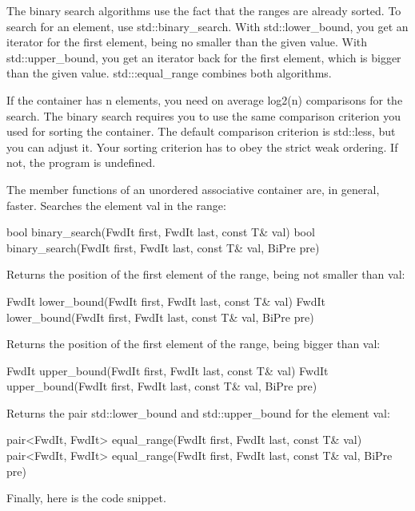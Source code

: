 The binary search algorithms use the fact that the ranges are already sorted. To search for an element, use std::binary\_search. With std::lower\_bound, you get an iterator for the first element, being no smaller than the given value. With std::upper\_bound, you get an iterator back for the first element, which is bigger than the given value. std:::equal\_range combines both algorithms.

If the container has n elements, you need on average log2(n) comparisons for the search. The binary search requires you to use the same comparison criterion you used for sorting the container. The default comparison criterion is std::less, but you can adjust it. Your sorting criterion has to obey the strict weak ordering. If not, the program is undefined.

The member functions of an unordered associative container are, in general, faster.
Searches the element val in the range:

\begin{cpp}
bool binary_search(FwdIt first, FwdIt last, const T& val)
bool binary_search(FwdIt first, FwdIt last, const T& val, BiPre pre)
\end{cpp}

Returns the position of the first element of the range, being not smaller than val:

\begin{cpp}
FwdIt lower_bound(FwdIt first, FwdIt last, const T& val)
FwdIt lower_bound(FwdIt first, FwdIt last, const T& val, BiPre pre)
\end{cpp}

Returns the position of the first element of the range, being bigger than val:

\begin{cpp}
FwdIt upper_bound(FwdIt first, FwdIt last, const T& val)
FwdIt upper_bound(FwdIt first, FwdIt last, const T& val, BiPre pre)
\end{cpp}

Returns the pair std::lower\_bound and std::upper\_bound for the element val:

\begin{cpp}
pair<FwdIt, FwdIt> equal_range(FwdIt first, FwdIt last, const T& val)
pair<FwdIt, FwdIt> equal_range(FwdIt first, FwdIt last, const T& val, BiPre pre)
\end{cpp}

Finally, here is the code snippet.


